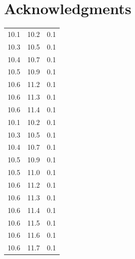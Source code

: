 \documentclass[usenatbib]{mn2e}
\begin{document}
\section*{Acknowledgments} 


\begin{table}
\begin{center}
\begin{tabular}{ccc}\hline\hline
10.1 & 10.2 & 0.1\\
10.3 & 10.5 & 0.1\\
10.4 & 10.7 & 0.1\\
10.5 & 10.9 & 0.1\\
10.6 & 11.2 & 0.1\\
10.6 & 11.3 & 0.1\\
10.6 & 11.4 & 0.1\\
10.1 & 10.2 & 0.1\\
10.3 & 10.5 & 0.1\\
10.4 & 10.7 & 0.1\\
10.5 & 10.9 & 0.1\\
10.5 & 11.0 & 0.1\\
10.6 & 11.2 & 0.1\\
10.6 & 11.3 & 0.1\\
10.6 & 11.4 & 0.1\\
10.6 & 11.5 & 0.1\\
10.6 & 11.6 & 0.1\\
10.6 & 11.7 & 0.1\\\hline\hline


\end{tabular}
\end{center}
\end{table}
\end{document}
